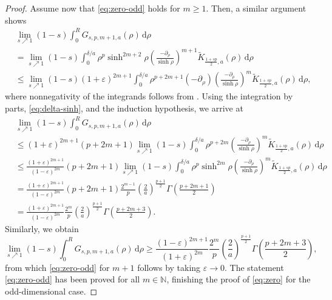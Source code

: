 \documentclass[10pt,a4paper]{amsart}
\begin{document}
\begin{proof}
Assume now that \eqref{eq:zero-odd} holds for $m \geq 1$. Then, a similar argument shows
\begin{equation*}
\begin{split}
&\lim_{s \nearrow 1} (1-s) \int_{0}^{R} G_{s, p, m+1, a}(\rho) \, \mathrm{d}\rho \\
&= \lim_{s \nearrow 1} (1-s) \int_{0}^{\delta/a} \rho^{p} \sinh^{2m+2} \rho \left( \frac{-\partial_{\rho}}{\sinh \rho} \right)^{m+1} \widetilde{K}_{\frac{1+sp}{2},a}(\rho) \, \mathrm{d}\rho \\
&\leq \lim_{s \nearrow 1} (1-s)(1+\varepsilon)^{2m+1} \int_{0}^{\delta/a} \rho^{p+2m+1}(-\partial_\rho) \left( \frac{-\partial_{\rho}}{\sinh \rho} \right)^{m} \widetilde{K}_{\frac{1+sp}{2},a}(\rho) \, \mathrm{d}\rho,
\end{split}
\end{equation*}
where nonnegativity of the integrands follows from . Using the integration by parts, \eqref{eq:delta-sinh}, and the induction hypothesis, we arrive at
\begin{equation*}
\begin{split}
&\lim_{s \nearrow 1} (1-s) \int_{0}^{R} G_{s, p, m+1, a}(\rho) \, \mathrm{d}\rho \\
&\leq (1+\varepsilon)^{2m+1} (p+2m+1) \lim_{s \nearrow 1} (1-s) \int_{0}^{\delta/a} \rho^{p+2m} \left( \frac{-\partial_\rho}{\sinh \rho} \right)^{m} \widetilde{K}_{\frac{1+sp}{2},a}(\rho) \, \mathrm{d}\rho \\
&\leq \frac{(1+\varepsilon)^{2m+1}}{(1-\varepsilon)^{2m}} (p+2m+1) \lim_{s \nearrow 1} (1-s) \int_{0}^{\delta/a} \rho^{p} \sinh^{2m}\rho \left( \frac{-\partial_\rho}{\sinh \rho} \right)^{m} \widetilde{K}_{\frac{1+sp}{2},a}(\rho) \, \mathrm{d}\rho \\
&= \frac{(1+\varepsilon)^{2m+1}}{(1-\varepsilon)^{2m}} (p+2m+1) \frac{2^{m-1}}{p} \left( \frac{2}{a} \right)^{\frac{p+1}{2}} \Gamma\left( \frac{p+2m+1}{2} \right) \\
&= \frac{(1+\varepsilon)^{2m+1}}{(1-\varepsilon)^{2m}} \frac{2^{m}}{p} \left( \frac{2}{a} \right)^{\frac{p+1}{2}} \Gamma\left( \frac{p+2m+3}{2} \right).
\end{split}
\end{equation*}
Similarly, we obtain
\begin{equation*}
\lim_{s \nearrow 1} (1-s) \int_{0}^{R} G_{s, p, m+1, a}(\rho) \, \mathrm{d}\rho \geq \frac{(1-\varepsilon)^{2m+1}}{(1+\varepsilon)^{2m}} \frac{2^{m}}{p} \left( \frac{2}{a} \right)^{\frac{p+1}{2}} \Gamma\left( \frac{p+2m+3}{2} \right),
\end{equation*}
from which \eqref{eq:zero-odd} for $m+1$ follows by taking $\varepsilon \to 0$. The statement \eqref{eq:zero-odd} has been proved for all $m \in \mathbb{N}$, finishing the proof of \eqref{eq:zero} for the odd-dimensional case.


\end{proof}
\end{document}
